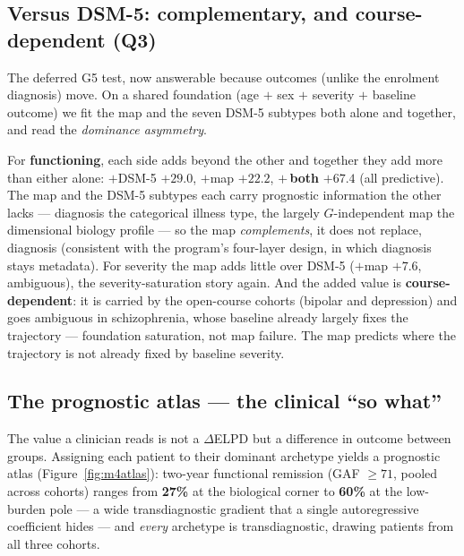 \subsection{Versus DSM-5: complementary, and course-dependent (Q3)}
The deferred G5 test, now answerable because outcomes (unlike the enrolment diagnosis) move. On a shared
foundation (age $+$ sex $+$ severity $+$ baseline outcome) we fit the map and the seven DSM-5 subtypes both
alone and together, and read the \emph{dominance asymmetry}.

\begin{keyresult}
For \textbf{functioning}, each side adds beyond the other and together they add more than either alone:
$+$DSM-5 $+29.0$, $+$map $+22.2$, $+$\,\textbf{both} $\mathbf{+67.4}$ (all predictive). The map and the
DSM-5 subtypes each carry prognostic information the other lacks --- diagnosis the categorical illness
type, the largely $G$-independent map the dimensional biology profile --- so the map \emph{complements}, it
does not replace, diagnosis (consistent with the program's four-layer design, in which diagnosis stays
metadata). For severity the map adds little over DSM-5 ($+$map $+7.6$, ambiguous), the severity-saturation
story again. And the added value is \textbf{course-dependent}: it is carried by the open-course cohorts
(bipolar and depression) and goes ambiguous in schizophrenia, whose baseline already largely fixes the
trajectory --- foundation saturation, not map failure. The map predicts where the trajectory is not already
fixed by baseline severity.
\end{keyresult}

\subsection{The prognostic atlas --- the clinical ``so what''}
\label{sub:m4atlas}
The value a clinician reads is not a $\Delta$ELPD but a difference in outcome between groups. Assigning each
patient to their dominant archetype yields a prognostic atlas (Figure~\ref{fig:m4atlas}): two-year
functional remission (GAF $\ge 71$, pooled across cohorts) ranges from \textbf{27\%} at the biological
corner to \textbf{60\%} at the low-burden pole --- a wide transdiagnostic gradient that a single
autoregressive coefficient hides --- and \emph{every} archetype is transdiagnostic, drawing patients from
all three cohorts.

